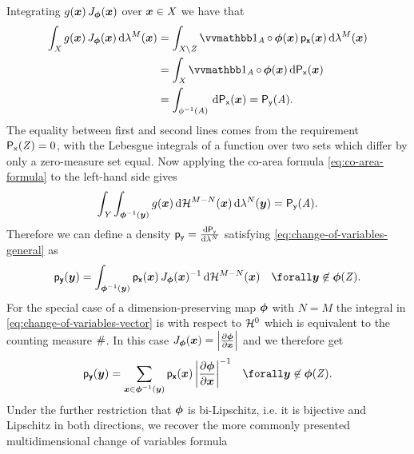 Integrating $g(\boldsymbol{x})\,J_{\boldsymbol{\phi}}(\boldsymbol{x})$ over $\boldsymbol{x} \in \mathit{X}$ we have that
\begin{align}\label{eq:change-of-var-real-vector-derivation-2}
  \int_{\set{X}} 
    g(\vct{x}) \, J_{\vct{\phi}}(\vct{x})
  \,\dr\lambda^{M}(\vct{x}) 
  &=
  \int_{\set{X}\setminus{\set{Z}}}
    \ind{\set{A}}\circ\,\vct{\phi}(\vct{x})\,
    \pden{\rvct{x}}(\vct{x})
  \,\dr\lambda^{M}(\vct{x})\\
  &=
  \int_{\set{X}}
    \ind{\set{A}}\circ\,\vct{\phi}(\vct{x})
  \,\dr\prob{\rvar{x}}(\vct{x})
  \\
  &=
  \int_{\phi^{-1}(\set{A})}
  \,\dr\prob{\rvar{x}}(\vct{x}) = \prob{\rvar{y}}(\set{A}).
\end{align}
The equality between first and second lines comes from the requirement $\mathsf{P}_{\mathsf{x}}(\mathit{Z}) = 0$, with the Lebesgue integrals of a function over two sets which differ by only a zero-measure set equal. Now applying the co-area formula \eqref{eq:co-area-formula} to the left-hand side gives
\begin{equation}\label{eq:change-of-var-real-vector-derivation-3}
  \int_{\set{Y}} \int_{\vct{\phi}^{-1}(\vct{y})} g(\vct{x}) \,\dr\haum{M-N}(\vct{x})\,\dr\lebm{N}(\vct{y})
  = \prob{\rvar{y}}(\set{A}).
\end{equation}
Therefore we can define a density $\pden{\rvar{y}} = \td{\prob{\rvar{y}}}{\lebm{N}}$ satisfying \eqref{eq:change-of-variables-general} as
\begin{equation}\label{eq:change-of-variables-vector}
  \pden{\rvct{y}}(\vct{y}) = 
  \int_{\vct{\phi}^{-1}(\vct{y})} 
    \pden{\rvct{x}}(\vct{x})\,J_{\vct{\phi}}(\vct{x})^{-1}
  \,\dr\haum{M-N}(\vct{x})
  \quad \forall \vct{y} \not\in \vct{\phi}(\set{Z}).
\end{equation}
For the special case of a dimension-preserving map $\boldsymbol{\phi}$ with $N = M$ the integral in \eqref{eq:change-of-variables-vector} is with respect to $\haum{0}$ which is equivalent to the counting measure $\#$. In this case $J_{\vct{\phi}}(\vct{x}) = \left|\pd{\vct{\phi}}{\vct{x}}\right|$ and we therefore get
\begin{equation}\label{eq:change-of-variables-vector-same-dim}
  \pden{\rvct{y}}(\vct{y}) = 
  \sum_{\vct{x} \in \vct{\phi}^{-1}(\vct{y})} 
    \pden{\rvct{x}}(\vct{x}) \, \left| \pd{\vct{\phi}}{\vct{x}} \right|^{-1}
  \quad \forall \vct{y} \not\in \vct{\phi}(\set{Z}).
\end{equation}
Under the further restriction that $\boldsymbol{\phi}$ is bi-Lipschitz, i.e. it is bijective and Lipschitz in both directions, we recover the more commonly presented multidimensional change of variables formula
